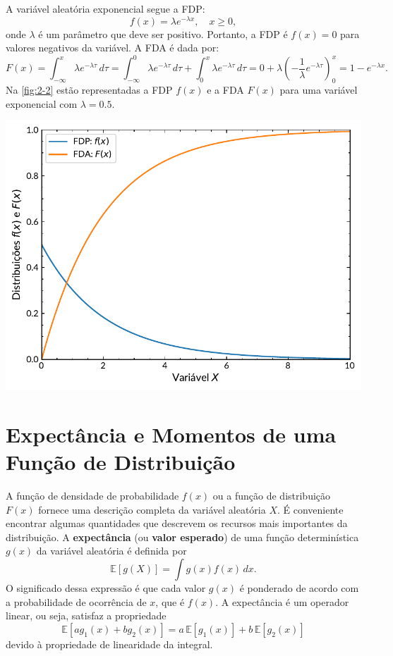 \begin{exemplo}{}{}
A variável aleatória exponencial segue a FDP:
\begin{equation}
f(x) = \lambda e^{-\lambda x}, \quad x \geq 0,
\end{equation}
onde $\lambda$ é um parâmetro que deve ser positivo. Portanto, a FDP é $f(x) = 0$ para valores negativos da variável. A FDA é dada por:
\begin{equation}
F(x) = \int_{-\infty}^{x} \lambda e^{-\lambda \tau}\, d\tau =  \int_{-\infty}^{0} \lambda e^{-\lambda \tau}\, d\tau + \int_{0}^{x} \lambda e^{-\lambda \tau}\, d\tau  = 0 + \lambda\left(-\dfrac{1}{\lambda}e^{-\lambda \tau}\right)_0^{x} = 1 - e^{-\lambda x}.
\end{equation} 
Na \autoref{fig:2-2} estão representadas a FDP $f(x)$ e a FDA $F(x)$ para uma variável exponencial com $\lambda = 0.5$.
\begin{center}
\includegraphics[width=0.65\linewidth]{Figuras/2-2.pdf}
\label{fig:2-2}
\end{center}
\end{exemplo}

\section{Expectância e Momentos de uma Função de Distribuição}

A função de densidade de probabilidade $f(x)$ ou a função de distribuição $F(x)$ fornece uma descrição completa da variável aleatória $X$. É conveniente encontrar algumas quantidades que descrevem os recursos mais importantes da distribuição. A \textbf{expectância} (ou \textbf{valor esperado}) de uma função determinística $g(x)$ da variável aleatória é definida por
\begin{equation}
\mathbb{E}[g(X)] = \int g(x) f(x)\, dx.
\end{equation}
O significado dessa expressão é que cada valor $g(x)$ é ponderado de acordo com a probabilidade de ocorrência de $x$, que é $f(x)$. A expectância é um operador linear, ou seja, satisfaz a propriedade
\begin{equation*}
\mathbb{E}[ag_1(x) + bg_2(x)] = a\,\mathbb{E}[g_1(x)] + b\,\mathbb{E}[g_2(x)]
\end{equation*}
devido à propriedade de linearidade da integral.

